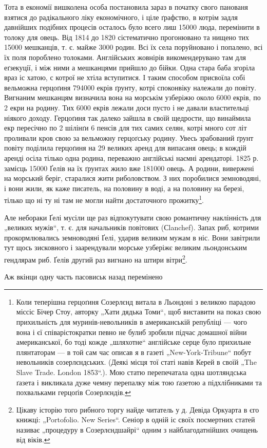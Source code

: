 Тота в економії вишколена особа постановила зараз в початку свого панованя взятися до радікального
ліку економічного, і ціле ґрафство, в котрім задля давнійших подібних процесів осталось
було всего лиш \num{15000} люда, перемінити в толоку для овець. Від 1814 до 1820 сістематично
прогонювано та нищено тих \num{15000} мешканців, т. є. майже 3000 родин. Всі їх села поруйновано і
попалено, всі їх поля пороблено толоками. Англійських жовнірів викомендерувано там для еґзекуції, і
між ними а мешканцями прийшло до бійки. Одна
стара баба згоріла враз іс хатою, с котрої не хтіла вступитися. І таким способом присвоїла собі
вельможна герцоґиня \num{794000} екрів ґрунту, котрі споконвіку належали до
повіту. Вигнаним мешканцям визначила вона на морськім узберіжю около 6000 екрів, по 2 екри на
родину. Тих 6000 екрів лежали доси пусто і не давали властительці ніякого
доходу. Герцоґиня так далеко зайшла в своїй щедрости, що винаймила екр пересічно по 2 шілінґи 6
пенсів для тих самих селян, котрі много сот літ проливали кров свою за
вельможну герцоґську родину. Увесь зрабований ґрунт повіту поділила герцоґиня на 29 великих аренд
для випасаня овець; в кождій аренді осіла тілько одна родина, переважно англійські наємні
арендаторі. 1825 р. замісць \num{15000} Ґелів на їх ґрунтах жило вже \num{181000} овець. А родини, вивержені на
морський беріг, старалися жити риболовством. З них поробилися земноводяні, і вони жили, як каже
писатель, на половину в воді, а на половину на березі, тілько що ні ту ні там не могли найти
достаточного прожитку\footnote{
Коли теперішна герцоґиня Созерлєнд витала в Льондоні з великою парадою міссіс Бічер Стоу,
авторку „Хати дядька Томи“, щоб виставити на показ свою прихильність для муринів-невольників в
американській републіці — чого вона і єї співарістократки певно не булиб зробили підчас домашної
війни американської, бо тоді кожде „шляхотне“ англійське серце було прихильне плянтаторам — в той
сам час описав
я в газеті „New-York-Tribune“ побут невольників созерлєндських. (Деякі місця тої статі навів Керей в
своїй „The Slave Trade. London 1853“.). Мою статю перепечатала одна шотляндська ґазета і викликала
дуже чемну перепалку між тою ґазетою а підхлібниками та похвальками герцоґів Созерлєндів.
}.

Але небораки Ґелі мусіли ще раз відпокутувати свою романтичну наклінність для „великих мужів“, т. є.
для начальників повітових (Сlanchef). Запах риб, котрими прокормлювались земноводяні Ґелі, ударив
великим мужам в ніс. Вони завітрили тут щось зисковного і заарендували морське узберіжє великим
льондонським гендлярам риб. Ґелів другий раз вигнано на штири вітри\footnote{
Цікаву історію того рибного торгу найде читатель у д. Девіда Оркуарта в єго книжці: „Portofolio.
New Series“. Сеніор в одній іс своїх посмертних статей називає „процедуру в Созерлєндшайрі“ одним з
найблагодатнійших очищень від віків.
}.

Аж вкінци одну часть пасовиськ назад перемінено
\parbreak{}
